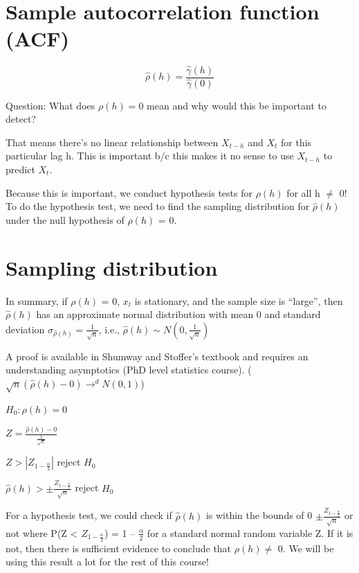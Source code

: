 \documentclass[
]{book}
\theoremstyle{definition}
\theoremstyle{definition}
\theoremstyle{definition}
\theoremstyle{definition}
\theoremstyle{remark}
\begin{document}
\hypertarget{sample-autocorrelation-function-acf}{%
\section{Sample autocorrelation function (ACF)}\label{sample-autocorrelation-function-acf}}

\[\hat{\rho}(h)=\frac{\hat{\gamma}(h)}{\hat{\gamma}(0)}\]

Question: What does \(\rho(h) = 0\) mean and why would this be important to detect?

That means there's no linear relationship between \(X_{t-h}\) and \(X_t\) for this particular lag h. This is important b/c this makes it no sense to use \(X_{t-h}\) to predict \(X_t\).

Because this is important, we conduct hypothesis tests for \(\rho(h)\) for all h \(\ne\) 0! To do the hypothesis test, we need to find the sampling distribution for \(\hat{\rho}(h)\) under the null hypothesis of \(\rho(h)\) = 0.

\hypertarget{sampling-distribution}{%
\section{Sampling distribution}\label{sampling-distribution}}

In summary, if \(\rho(h)\) = 0, \(x_t\) is stationary, and the sample size is ``large'', then \(\hat{\rho}(h)\) has an approximate normal distribution with mean 0 and standard deviation \(\sigma_{\hat{\rho}(h)}=\frac{1}{\sqrt{n}}\), i.e., \(\hat{\rho}(h)\sim N(0,\frac{1}{\sqrt{n}})\)

A proof is available in Shumway and Stoffer's textbook and requires an understanding asymptotics (PhD level statistics course). (\(\sqrt{n}(\hat{\rho}(h)-0) \to^{d} N(0,1)\))

\(H_0: \rho(h)=0\)

\(Z=\frac{\hat{\rho}(h)-0}{\frac{1}{\sqrt{n}}}\)

\(Z>|Z_{1-\frac{\alpha}{2}}|\) reject \(H_0\)

\(\hat{\rho}(h)>\pm \frac{Z_{1-\frac{\alpha}{2}}}{\sqrt{n}}\) reject \(H_0\)

For a hypothesis test, we could check if \(\hat{\rho}(h)\) is within the bounds of 0 \(\pm \frac{Z_{1-\frac{\alpha}{2}}}{\sqrt{n}}\) or not where P(Z \textless{} \(Z_{1-\frac{\alpha}{2}}\)) = 1 -- \(\frac{\alpha}{2}\) for a standard normal random variable Z. If it is not, then there is sufficient evidence to conclude that \(\rho(h) \ne\) 0. We will be using this result a lot for the rest of this course!
\end{document}
